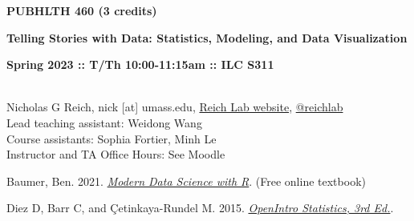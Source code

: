 \documentclass[10pt]{article}
\begin{document}
\centerline{\bf \large PUBHLTH 460 (3 credits)}
\centerline{\bf \large Telling Stories with Data: Statistics, Modeling, and Data Visualization}
\centerline{\bf Spring 2023 :: T/Th 10:00-11:15am :: ILC S311 }

\vspace{.25in}
\\
\noindent Nicholas G Reich,  nick [at] umass.edu,  \href{http://reichlab.github.io}{Reich Lab website},  \href{https://twitter.com/reichlab}{@reichlab}\\
\noindent Lead teaching assistant: Weidong Wang\\
\noindent Course assistants:
Sophia Fortier, Minh Le\\
\noindent Instructor and TA Office Hours: See Moodle






\bigskip
{}


Baumer, Ben. 2021.  \emph{\href{https://mdsr-book.github.io/mdsr2e/}{Modern Data Science with R}}. (Free online textbook)





Diez D, Barr C, and \c{C}etinkaya-Rundel M. 2015. \emph{\href{http://www.openintro.org/stat/index.php}{OpenIntro Statistics, 3rd Ed.}}.
\end{document}
